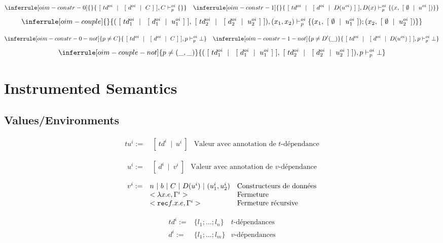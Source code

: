 \documentclass{article}
\newcommand\rec[3]{{\tt rec} #1.#2.#3}
\newcommand\closure[3]{< \lambda #1.#2, #3 >}
\newcommand\recclosure[4]{< \rec{#1}{#2}{#3}, #4 >}
\newcommand\isfilteredtoi[3]{#1, #2 \vdash^{oi}_p #3}
\newcommand\oitval[2]{\ [\ #1\ \mid\ #2\ ]}
\newcommand\oival[2]{\ [\ #1\ \mid\ #2\ ]}
\begin{document}
$$
\inferrule [oim-constr-0]
{  }
{ \isfilteredtoi{\oitval{td^{oi}}{\oival{d^{oi}}{C}}}{C}{\{\}} }
\hspace{10pt}
\inferrule [oim-constr-1]
{  }
{ \isfilteredtoi{\oitval{td^{oi}}{\oival{d^{oi}}{D(u^{oi})}}}{D(x)}{\{(x, \oitval{\emptyset}{u^{oi}})\}} }
$$
$$
\inferrule [oim-couple]
{  }
{ \isfilteredtoi{(\oitval{td^{oi}_1}{\oival{d^{oi}_1}{u^{oi}_1}}, \oitval{td^{oi}_2}{\oival{d^{oi}_2}{u^{oi}_2}})}{(x_1, x_2)}{\{(x_1, \oitval{\emptyset}{u^{oi}_1}); (x_2, \oitval{\emptyset}{u^{oi}_2})\}} }
$$

$$
\inferrule [oim-constr-0-not]
{ p \neq C }
{ \isfilteredtoi{\oitval{td^{oi}}{\oival{d^{oi}}{C}}}{p}{\bot} }
\hspace{10pt}
\inferrule [oim-constr-1-not]
{ p \neq D'(\_) }
{ \isfilteredtoi{\oitval{td^{oi}}{\oival{d^{oi}}{D(u^{oi})}}}{p}{\bot} }
$$
$$
\inferrule [oim-couple-not]
{ p \neq (\_, \_) }
{ \isfilteredtoi{(\oitval{td^{oi}_1}{\oival{d^{oi}_1}{u^{oi}_1}}, \oitval{td^{oi}_2}{\oival{d^{oi}_2}{u^{oi}_2}})}{p}{\bot} }
$$


\section{Instrumented Semantics}
\subsection{Values/Environments}
$$
\begin{array}{rll}
tu^{i} := & \oitval{td^{i}}{u^{i}} & \mbox{Valeur avec annotation de $t$-dépendance}
\end{array}
$$

$$
\begin{array}{rll}
u^{i} := & \oitval{d^{i}}{v^{i}} & \mbox{Valeur avec annotation de $v$-dépendance}
\end{array}
$$

$$
\begin{array}{rll}
v^{i} := & n\ |\ b\ |\ C\ |\ D(u^{i})\ |\ (u^{i}_1, u^{i}_2) & \mbox{Constructeurs de données} \\
     & \closure{x}{e}{\Gamma^{i}} & \mbox{Fermeture}\\
     & \recclosure{f}{x}{e}{\Gamma^{i}} & \mbox{Fermeture récursive}
\end{array}
$$

$$
\begin{array}{rll}
td^{i} := & \{l_1; \ldots; l_n\} & \mbox{$t$-dépendances}\\
d^{i} := & \{l_1; \ldots; l_m\} & \mbox{$v$-dépendances}\\
\end{array}
$$
\end{document}

